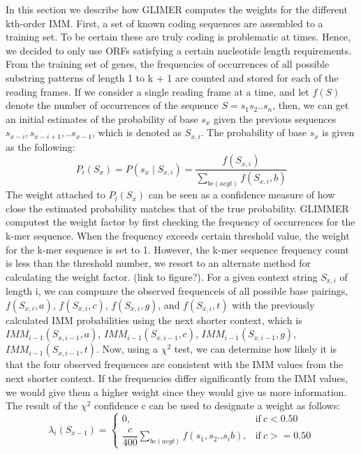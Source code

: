 \documentclass[11pt,letterpaper]{article}
\begin{document}
In this section we describe how GLIMER computes the weights for the different kth-order IMM. First, a set of known coding sequences are assembled to a training set. To be certain these are truly coding is problematic at times. Hence, we decided to only use ORFs satisfying a certain nucleotide length requirements. \\
From the training set of genes, the frequencies of occurrences of all possible substring patterns of length 1 to k + 1 are counted and stored for each of the reading frames. If we consider a single reading frame at a time, and let $f(S)$ denote the number of occurrences of the sequence $S = s_1s_2..s_n$, then, we can get an initial estimates of the probability of base $s_x$ given the previous sequences $s_{x-i}, s_{x-i+1}, .. s_{x-1}$, which is denoted as $S_{x,i}$. The probability of base $s_x$ is given as the following:
\begin{equation}
P_i(S_x) = P(s_x \mid S_{x,i})  = \dfrac{f(S_{x,i})}{\sum_{be(acgt)}f(S_{x,i}, b)}
\end{equation}
The weight attached to $P_i(S_x)$ can be seen as a confidence measure of how close the estimated probability matches that of the true probability. GLIMMER computest the weight factor by first checking the frequency of occurrences for the k-mer sequence. When the frequency exceeds certain threshold value, the weight for the k-mer sequence is set to 1. However, the k-mer sequence frequency count is less than the threshold number, we resort to an alternate method for calculating the weight factor. (link to figure?). For a given context string $S_{x,i}$ of length i, we can compuare the observed frequenceis of all possible base pairings, $f(S_{x,i},a)$, $f(S_{x,i},c)$, $f(S_{x,i},g)$, and $f(S_{x,i},t)$ with the previously calculated IMM probabilities using the next shorter context, which is $IMM_{i-1}(S_{x,i-1},a)$, $IMM_{i-1}(S_{x,i-1},c)$, $IMM_{i-1}(S_{x,i-1},g)$, $IMM_{i-1}(S_{x,i-1},t)$. Now, using a $\chi^2$ test, we can determine how likely it is that the four observed frequences are consistent with the IMM values from the next shorter context. If the frequencies differ significantly from the IMM values, we would give them a higher weight since they would give us more information. The result of the $\chi^2$ confidence c can be used to designate a weight as follows:
\begin{equation}
\lambda_i(S_{x-1})=
\begin{cases}
0, & \text{if}\ c < 0.50 \\
\dfrac{c}{400}\sum_{be(acgt)}f(s_1,s_2..s_ib), & \text{if}\ c>= 0.50
\end{cases}
\end{equation}
\end{document}
